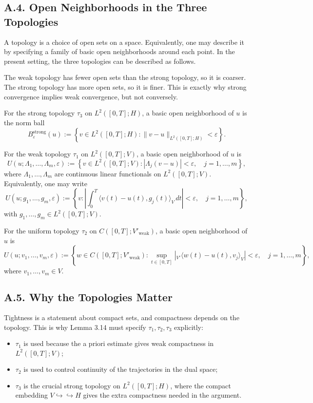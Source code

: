 \documentclass[11pt]{article}
\theoremstyle{definition}
\theoremstyle{remark}
\newcommand{\dual}[2]{{}_{V'}\langle #1, #2 \rangle_{V}}
\begin{document}
\subsection*{A.4. Open Neighborhoods in the Three Topologies}
A topology is a choice of open sets on a space. Equivalently, one may describe it by specifying a family of basic open neighborhoods around each point. In the present setting, the three topologies can be described as follows.

The weak topology has fewer open sets than the strong topology, so it is coarser. The strong topology has more open sets, so it is finer. This is exactly why strong convergence implies weak convergence, but not conversely.

For the strong topology $\tau_3$ on $L^2([0,T];H)$, a basic open neighborhood of $u$ is the norm ball
\[
  B^{\mathrm{strong}}_\varepsilon(u)
  :=
  \left\{
    v\in L^2([0,T];H):
    \|v-u\|_{L^2([0,T];H)}<\varepsilon
  \right\}.
\]

For the weak topology $\tau_1$ on $L^2([0,T];V)$, a basic open neighborhood of $u$ is
\[
  U(u;\Lambda_1,\dots,\Lambda_m,\varepsilon)
  :=
  \left\{
    v\in L^2([0,T];V):
    |\Lambda_j(v-u)|<\varepsilon,\quad j=1,\dots,m
  \right\},
\]
where $\Lambda_1,\dots,\Lambda_m$ are continuous linear functionals on $L^2([0,T];V)$. Equivalently, one may write
\[
  U(u;g_1,\dots,g_m,\varepsilon)
  :=
  \left\{
    v:
    \left|
      \int_0^T \langle v(t)-u(t),g_j(t)\rangle_V\,dt
    \right|<\varepsilon,\quad j=1,\dots,m
  \right\},
\]
with $g_1,\dots,g_m\in L^2([0,T];V)$.

For the uniform topology $\tau_2$ on $C([0,T];V'_{\mathrm{weak}})$, a basic open neighborhood of $u$ is
\[
  U(u;v_1,\dots,v_m,\varepsilon)
  :=
  \left\{
    w\in C([0,T];V'_{\mathrm{weak}}):
    \sup_{t\in[0,T]}
    \left|
      \dual{w(t)-u(t)}{v_j}
    \right|<\varepsilon,\quad j=1,\dots,m
  \right\},
\]
where $v_1,\dots,v_m\in V$.

\subsection*{A.5. Why the Topologies Matter}
Tightness is a statement about compact sets, and compactness depends on the topology. This is why Lemma 3.14 must specify $\tau_1,\tau_2,\tau_3$ explicitly:
\begin{itemize}
\item $\tau_1$ is used because the a priori estimate gives weak compactness in $L^2([0,T];V)$;
\item $\tau_2$ is used to control continuity of the trajectories in the dual space;
\item $\tau_3$ is the crucial strong topology on $L^2([0,T];H)$, where the compact embedding $V\hookrightarrow\hookrightarrow H$ gives the extra compactness needed in the argument.
\end{itemize}
\end{document}
